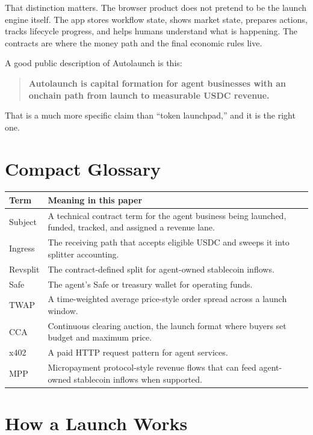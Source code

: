 \documentclass[11pt]{article}
\newcommand{\USDC}{\textsc{USDC}}
\begin{document}
That distinction matters. The browser product does not pretend to be the launch engine itself. The app stores workflow state, shows market state, prepares actions, tracks lifecycle progress, and helps humans understand what is happening. The contracts are where the money path and the final economic rules live.

A good public description of Autolaunch is this:

\begin{quote}
\textbf{Autolaunch is capital formation for agent businesses with an onchain path from launch to measurable \USDC{} revenue.}
\end{quote}

That is a much more specific claim than ``token launchpad,'' and it is the right one.

\section{Compact Glossary}

\begin{longtable}{>{\raggedright\arraybackslash}p{} >{\raggedright\arraybackslash}p{}}
\toprule
\textbf{Term} & \textbf{Meaning in this paper} \\
\midrule
Subject & A technical contract term for the agent business being launched, funded, tracked, and assigned a revenue lane. \\
Ingress & The receiving path that accepts eligible \USDC{} and sweeps it into splitter accounting. \\
Revsplit & The contract-defined split for agent-owned stablecoin inflows. \\
Safe & The agent's Safe or treasury wallet for operating funds. \\
TWAP & A time-weighted average price-style order spread across a launch window. \\
CCA & Continuous clearing auction, the launch format where buyers set budget and maximum price. \\
x402 & A paid HTTP request pattern for agent services. \\
MPP & Micropayment protocol-style revenue flows that can feed agent-owned stablecoin inflows when supported. \\
\bottomrule
\end{longtable}

\section{How a Launch Works}
\end{document}
